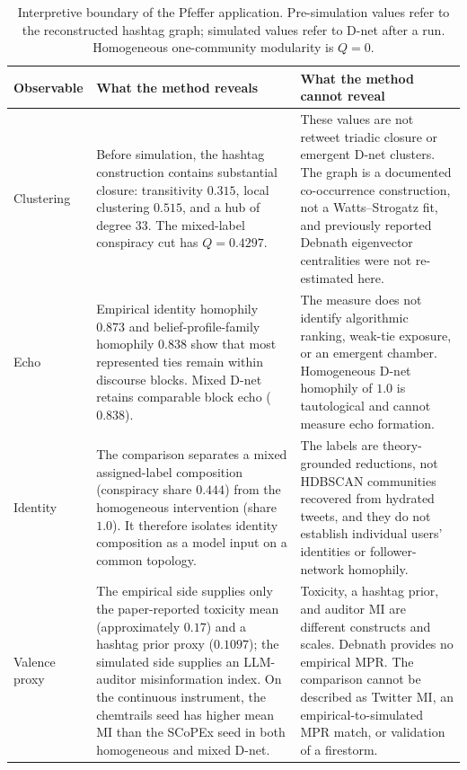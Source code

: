 \begin{table}[t]
\centering
\caption{Interpretive boundary of the Pfeffer application. Pre-simulation
values refer to the reconstructed hashtag graph; simulated values refer to
D-net after a run. Homogeneous one-community modularity is \(Q=0\).}
\label{tab:pfeffer-reveal-limits}
\scriptsize
\begin{tabular}{p{}p{}p{}}
\toprule
Observable & What the method reveals & What the method cannot reveal \\
\midrule
Clustering
& Before simulation, the hashtag construction contains substantial closure:
  transitivity \(0.315\), local clustering \(0.515\), and a hub of degree
  33.  The mixed-label conspiracy cut has \(Q=0.4297\).
& These values are not retweet triadic closure or emergent D-net clusters.
  The graph is a documented co-occurrence construction, not a
  Watts--Strogatz fit, and previously reported Debnath eigenvector
  centralities were not re-estimated here. \\

Echo
& Empirical identity homophily \(0.873\) and belief-profile-family
  homophily \(0.838\) show that most represented ties remain within discourse
  blocks.  Mixed D-net retains comparable block echo
  (\(0.838\)).
& The measure does not identify algorithmic ranking, weak-tie exposure, or
  an emergent chamber.  Homogeneous D-net homophily of \(1.0\) is tautological
  and cannot measure echo formation. \\

Identity
& The comparison separates a mixed assigned-label composition
  (conspiracy share \(0.444\)) from the homogeneous intervention
  (share \(1.0\)).  It therefore isolates identity composition as a model
  input on a common topology.
& The labels are theory-grounded reductions, not HDBSCAN communities
  recovered from hydrated tweets, and they do not establish individual
  users' identities or follower-network homophily. \\

Valence proxy
& The empirical side supplies only the paper-reported toxicity mean
  (approximately \(0.17\)) and a hashtag prior proxy (\(0.1097\)); the
  simulated side supplies an LLM-auditor misinformation index.  On the
  continuous instrument, the chemtrails seed has higher mean \(\mathrm{MI}\)
  than the SCoPEx seed in both homogeneous and mixed D-net.
& Toxicity, a hashtag prior, and auditor \(\mathrm{MI}\) are different
  constructs and scales.  Debnath provides no empirical \(\mathrm{MPR}\).
  The comparison cannot be described as Twitter \(\mathrm{MI}\), an
  empirical-to-simulated \(\mathrm{MPR}\) match, or validation of a
  firestorm. \\


\end{tabular}
\end{table}
